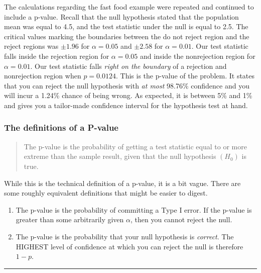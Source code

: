 \documentclass[
]{book}
\begin{document}
The calculations regarding the fast food example were repeated and continued to include a p-value. Recall that the null hypothesis stated that the population mean was equal to 4.5, and the test statistic under the null is equal to 2.5. The critical values marking the boundaries between the do not reject region and the reject regions was \(\pm 1.96\) for \(\alpha=0.05\) and \(\pm 2.58\) for \(\alpha=0.01\). Our test statistic falls inside the rejection region for \(\alpha=0.05\) and inside the nonrejection region for \(\alpha=0.01\). Our test statistic falls \emph{right on the boundary} of a rejection and nonrejection region when \(p=0.0124\). This is the p-value of the problem. It states that you can reject the null hypothesis with \emph{at most} 98.76\% confidence and you will incur a 1.24\% chance of being wrong. As expected, it is between 5\% and 1\% and gives you a tailor-made confidence interval for the hypothesis test at hand.

\hypertarget{the-definitions-of-a-p-value}{%
\subsubsection*{The definitions of a P-value}\label{the-definitions-of-a-p-value}}

\begin{quote}
The p-value is the probability of getting a test statistic equal to or more extreme than the sample result, given that the null hypothesis \((H_0)\) is true.
\end{quote}

While this is the technical definition of a p-value, it is a bit vague. There are some roughly equivalent definitions that might be easier to digest.

\begin{enumerate}
\def\labelenumi{\arabic{enumi}.}
\item
  The p-value is the probability of committing a Type I error. If the p-value is greater than some arbitrarily given \(\alpha\), then you cannot reject the null.
\item
  The p-value is the probability that your null hypothesis is \emph{correct}. The HIGHEST level of confidence at which you can reject the null is therefore \(1-p\).
\end{enumerate}

\begin{center}\rule{0.5\linewidth}{0.5pt}\end{center}
\end{document}
